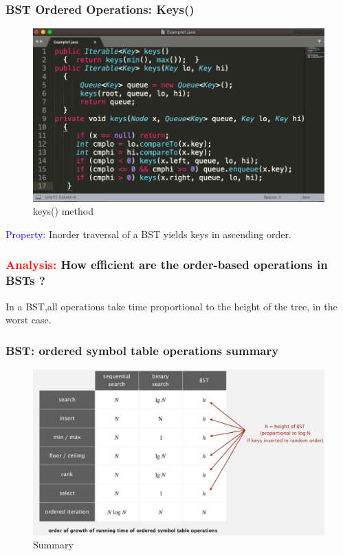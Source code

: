 \documentclass[11pt]{beamer}
\begin{document}
     \begin{frame}
    	\frametitle{BST Ordered Operations: Keys()}
         \begin{figure}
         	\centering
         	\includegraphics[width=0.9\linewidth]{"Screenshot 2020-11-13 at 4.09.37 PM"}
         	\caption{keys() method}
         	\label{fig:screenshot-2020-11-13-at-4}
         \end{figure}
        \textcolor{blue}{Property: } Inorder traversal of a BST yields keys in ascending order.
    \end{frame}	

     \begin{frame}
    	\frametitle{\textcolor{red}{Analysis:} How efficient are the order-based operations in BSTs ?} 
    	\alert{ In a BST,all operations take time proportional to the height of the tree, in the worst case.}
    \end{frame}	

    

      \begin{frame}
    	\frametitle{BST: ordered symbol table operations summary} 
    	\begin{figure}
    		\centering
    		\includegraphics[width=1.1\linewidth]{"Screenshot 2020-11-13 at 8.43.37 PM"}
    		\caption{Summary}
    		\label{fig:screenshot-2020-11-13-at-8}
    	\end{figure}  	
    \end{frame}	
\end{document}
